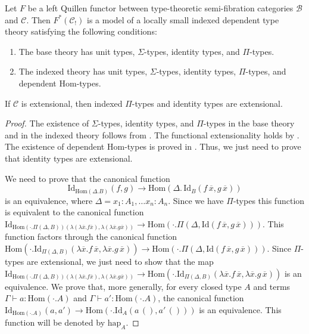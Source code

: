\documentclass[reqno]{amsart}
\theoremstyle{definition}
\theoremstyle{remark}
\newcommand{\fs}[1]{\mathrm{#1}}
\newcommand{\scat}[1]{\mathcal{#1}}
\newcommand{\Hom}{\fs{Hom}}
\newcommand{\Id}{\fs{Id}}
\numberwithin{figure}{section}
\begin{document}
\begin{prop}
Let $F$ be a left Quillen functor between type-theoretic semi-fibration categories $\scat{B}$ and $\scat{C}$.
Then $F^*(\scat{C}_!)$ is a model of a locally small indexed dependent type theory satisfying the following conditions:
\begin{enumerate}
\item The base theory has unit types, $\Sigma$-types, identity types, and $\Pi$-types.
\item The indexed theory has unit types, $\Sigma$-types, identity types, $\Pi$-types, and dependent $\Hom$-types.
\end{enumerate}
If $\scat{C}$ is extensional, then indexed $\Pi$-types and identity types are extensional.
\end{prop}
\begin{proof}
The existence of $\Sigma$-types, identity types, and $\Pi$-types in the base theory and in the indexed theory follows from \cite{local-universes}.
The functional extensionality holds by \cite[Lemma~5.9]{shul-inv}.
The existence of dependent $\Hom$-types is proved in .
Thus, we just need to prove that identity types are extensional.

We need to prove that the canonical function
\[ \Id_{\Hom(\Delta.B)}(f,g) \to \Hom(\Delta.\,\Id_B(f\,\overline{x},g\,\overline{x})) \] is an equivalence, where $\Delta = x_1 : A_1, \ldots x_n : A_n$.
Since we have $\Pi$-types this function is equivalent to the canonical function $\Id_{\Hom(\cdot . \Pi(\Delta,B))(\lambda(\lambda \overline{x}.f\overline{x}),\lambda(\lambda \overline {x}.g\overline{x}))} \to \Hom(\cdot . \Pi(\Delta, \Id(f\,\overline{x},g\,\overline{x})))$.
This function factors through the canonical function $\Hom(\cdot . \Id_{\Pi(\Delta,B)}(\lambda \overline{x}. f\,\overline{x}, \lambda \overline{x}. g\,\overline{x})) \to \Hom(\cdot . \Pi(\Delta, \Id(f\,\overline{x},g\,\overline{x})))$.
Since $\Pi$-types are extensional, we just need to show that the map $\Id_{\Hom(\cdot . \Pi(\Delta,B))(\lambda(\lambda \overline{x}.f\overline{x}),\lambda(\lambda \overline {x}.g\overline{x}))} \to \Hom(\cdot . \Id_{\Pi(\Delta,B)}(\lambda \overline{x}. f\,\overline{x}, \lambda \overline{x}. g\,\overline{x}))$ is an equivalence.
We prove that, more generally, for every closed type $A$ and terms $\Gamma \vdash a : \Hom(\cdot.A)$ and $\Gamma \vdash a' : \Hom(\cdot.A)$, the canonical function $\Id_{\Hom(\cdot . A)}(a,a') \to \Hom(\cdot . \Id_A(a\,(),a'\,()))$ is an equivalence.
This function will be denoted by $\fs{hap}_A$.


\end{proof}
\end{document}

